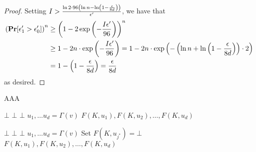 \begin{lemma}
\begin{proof}
		Setting $I > \frac{\ln2 \cdot 96\left(\ln n - \ln \left(1 - \frac{\epsilon}{8d}\right)\right)}{\epsilon'}$, we have that
		\begin{align*}
			\left(\operatorname*{\mathbf{Pr}}[\epsilon'_1 > \epsilon'_0]\right)^n &\geq \left(1 - 2\exp\left( -\frac{I\epsilon'}{96}\right)\right)^n \\
			&\geq 1 - 2n \cdot \exp\left( -\frac{I\epsilon'}{96}\right) = 1 - 2n \cdot \exp\left( -\left(\ln n + \ln\left(1 - \frac{\epsilon}{8d}\right)\right) \cdot 2\right)\\
			&= 1 - \left(1 - \frac{\epsilon}{8d}\right) = \frac{\epsilon}{8d}
		\end{align*}
		as desired.
	\end{proof}
	
\end{lemma}

\begin{lemma}
	\label{lemma:hybC}
	AAA
\end{lemma}

\begin{algorithm}[H]
	\caption{
		Circuit for the neighbor function, $\circNeigb$ with punctured PRF key
		$K(\set{w^*})$ and constant $w^*, z^*$%
	}
	\begin{algorithmic}[1]
				\State \Return $\bot$
			\EndIf
				\State \Return $\bot$ 
			\EndIf
				\State \Return $\bot$
			\EndIf
			\State $u_1, \dots u_d = \Gamma(v)$
			\State \Return $F(K, u_1), F(K, u_2), \dots, F(K, u_d)$
		\EndFunction
	\end{algorithmic}
	\label{alg:neighbHyb1}
\end{algorithm}


\begin{algorithm}[H]
	\caption{
		Circuit for the neighbor function, $\circNeigb$ with punctured PRF key
		$K(\set{w^*})$ and constant $w^*, Y^*, J^*, z^*$%
	}
	\begin{algorithmic}[1]
				\State \Return $\bot$
			\EndIf
				\State \Return $\bot$ 
			\EndIf
				\State \Return $\bot$
			\EndIf
			\State $u_1, \dots u_d = \Gamma(v)$
			 	\State Set $F(K, u_{j^*}) = \bot$
			\EndIf
			\State \Return $F(K, u_1), F(K, u_2), \dots, F(K, u_d)$
		\EndFunction
	\end{algorithmic}
	\label{alg:neighbHyb2}
\end{algorithm}

